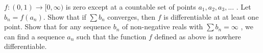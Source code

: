 $f: (0,1) \rightarrow [0, \infty)$ is zero except at a countable set of points $a_{1}, a_2, a_3, ... $ . Let $b_n = f(a_n)$. Show that if $\sum b_{n}$ converges, then $f$ is differentiable at at least one point. Show that for any sequence $b_{n}$ of non-negative reals with  $\sum b_{n} =\infty$ , we can find a sequence $a_{n}$ such that the function $f$ defined as above is nowhere differentiable.